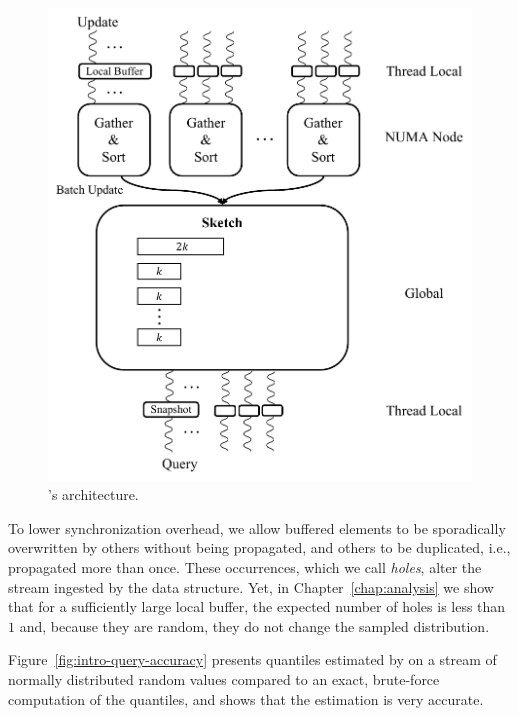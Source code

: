 \begin{figure}[htp]
    \centering
    \hspace{70pt}
        \includegraphics[width=0.8\linewidth,trim={0cm 0cm 0cm 0.1cm},clip]{graphics/algorithm/architecture.pdf}
    \caption{\mysketch's architecture.}
    \label{fig:quancurrentDS}
\end{figure}


To lower synchronization overhead, we allow buffered elements to be sporadically overwritten by others without being propagated, and others to be duplicated, i.e., propagated more than once. These occurrences, which we call \emph{holes}, alter the stream ingested by the data structure. 
Yet, in Chapter~\ref{chap:analysis} we show that for a sufficiently large local buffer, the expected number of holes is less than $1$ and, because they are random, they do not change the sampled distribution.


Figure~\ref{fig:intro-query-accuracy} presents quantiles estimated by \mysketch on a stream of normally distributed random values compared to an exact, brute-force computation of the quantiles, and shows that the estimation is very accurate.

